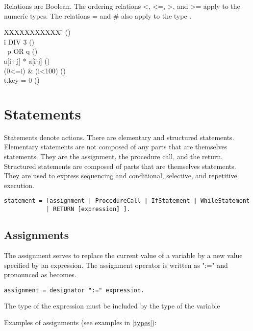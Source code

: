 \documentclass[12pt]{article}
\begin{document}
Relations are Boolean. The ordering relations <, <=, >, and >= apply to the numeric types. The relations = and \# also apply to the type \BOOLEAN.

\begin{tabbing}
    XXXXXXXXXXX \=  \> (\INTEGER) \\
    i DIV 3 \> (\INTEGER) \\
    ~p OR q \> (\BOOLEAN) \\
    a[i+j] * a[i-j] \> (\INTEGER) \\
    (0<=i) \& (i<100) \> (\BOOLEAN) \\
    t.key = 0 \> (\BOOLEAN) \\
\end{tabbing}

\section{Statements}

Statements denote actions. There are elementary and structured statements. Elementary statements are not composed of any parts that are themselves statements. They are the assignment, the procedure call, and the return. 
Structured statements are composed of parts that are themselves statements. They are used to express sequencing and conditional, selective, and repetitive execution.

\begin{lstlisting}[style=ebnf]
statement = [assignment | ProcedureCall | IfStatement | WhileStatement 
            | RETURN [expression] ].
\end{lstlisting}

\subsection{Assignments}
\label{assignment}

The assignment serves to replace the current value of a variable by a new value specified by an expression. The assignment operator is written as ":=" and pronounced as becomes.

\begin{lstlisting}[style=ebnf]
    assignment = designator ":=" expression.
\end{lstlisting} 

The type of the expression must be included by the type of the variable

Examples of assignments (see examples in \ref{types}):
\end{document}
